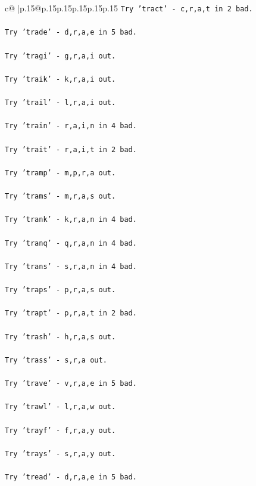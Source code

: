 \documentclass{article}
\begin{document}
{\begin{supertabular}{c@{$\;$}|p{.15\linewidth}@{}p{.15\linewidth}p{.15\linewidth}p{.15\linewidth}p{.15\linewidth}p{.15\linewidth}}
{{{\texttt{Try 'tract' {-} c,r,a,t in 2 bad.} \\
\\ 
\texttt{Try 'trade' {-} d,r,a,e in 5 bad.} \\
\\ 
\texttt{Try 'tragi' {-} g,r,a,i out.} \\
\\ 
\texttt{Try 'traik' {-} k,r,a,i out.} \\
\\ 
\texttt{Try 'trail' {-} l,r,a,i out.} \\
\\ 
\texttt{Try 'train' {-} r,a,i,n in 4 bad.} \\
\\ 
\texttt{Try 'trait' {-} r,a,i,t in 2 bad.} \\
\\ 
\texttt{Try 'tramp' {-} m,p,r,a out.} \\
\\ 
\texttt{Try 'trams' {-} m,r,a,s out.} \\
\\ 
\texttt{Try 'trank' {-} k,r,a,n in 4 bad.} \\
\\ 
\texttt{Try 'tranq' {-} q,r,a,n in 4 bad.} \\
\\ 
\texttt{Try 'trans' {-} s,r,a,n in 4 bad.} \\
\\ 
\texttt{Try 'traps' {-} p,r,a,s out.} \\
\\ 
\texttt{Try 'trapt' {-} p,r,a,t in 2 bad.} \\
\\ 
\texttt{Try 'trash' {-} h,r,a,s out.} \\
\\ 
\texttt{Try 'trass' {-} s,r,a out.} \\
\\ 
\texttt{Try 'trave' {-} v,r,a,e in 5 bad.} \\
\\ 
\texttt{Try 'trawl' {-} l,r,a,w out.} \\
\\ 
\texttt{Try 'trayf' {-} f,r,a,y out.} \\
\\ 
\texttt{Try 'trays' {-} s,r,a,y out.} \\
\\ 
\texttt{Try 'tread' {-} d,r,a,e in 5 bad.} \\
}}}
\end{supertabular}}
\end{document}

